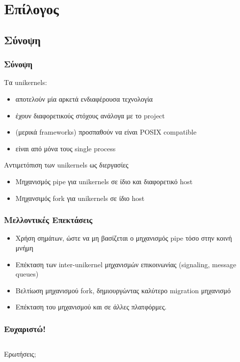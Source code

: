 \documentclass[red,slidestop,notes,compress,mathserif]{beamer}
\begin{document}
\section*{Επίλογος}

\subsection*{Σύνοψη}

\begin{frame}
\frametitle{Σύνοψη}
Τα unikernels:
\begin{itemize}
\item αποτελούν μία αρκετά ενδιαφέρουσα τεχνολογία
\item έχουν διαφορετικούς στόχους ανάλογα με το project
\item (μερικά frameworks) προσπαθούν να είναι POSIX compatible
\item είναι από μόνα τους single process
\end{itemize}
\begin{block}{Αντιμετόπιση των unikernels ως διεργασίες}
\begin{itemize}
\item Μηχανισμός pipe για unikernels σε ίδιο και διαφορετικό host
\item Μηχανσιμός fork για unikernels σε ίδιο host
\end{itemize}
\end{block}
\end{frame}

\begin{frame}
\frametitle{Μελλοντικές Επεκτάσεις}
\begin{itemize}
\item Χρήση σημάτων, ώστε να μη βασίζεται ο μηχανισμός pipe τόσο στην κοινή μνήμη
\item Επέκταση των inter-unikernel μηχανισμών επικοινωνίας (signaling, message queues)
\item Βελτίωση μηχανισμού fork, δημιουργώντας καλύτερο migration μηχανισμό
\item Επέκταση του μηχανισμού και σε άλλες πλατφόρμες.
\end{itemize}

\end{frame}
%
\begin{frame}
\frametitle{Ευχαριστώ!}
                \vfill%
\begin{columns}
        \begin{center}
        \begin{center}
                        {\LARGE Ερωτήσεις;}
        \end{center}
                \vfill%
        \end{center}
\end{columns}
                \vfill%
\end{frame}
\end{document}
